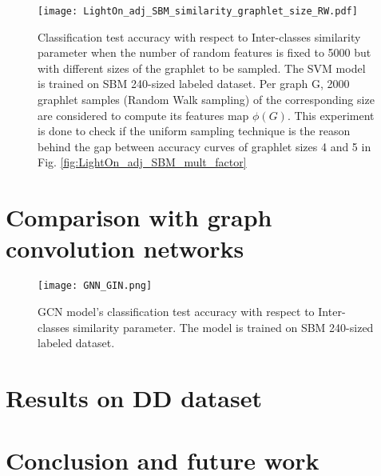 \begin{figure}[H]
\centering
\texttt{[image: LightOn\_adj\_SBM\_similarity\_graphlet\_size\_RW.pdf]}
\caption[Classification test accuracy as a function of Inter-classes similarity parameter ]{Classification test accuracy with respect to Inter-classes similarity parameter when the number of random features is fixed to 5000 but with different sizes of the graphlet to be sampled. The SVM model is trained on SBM 240-sized labeled dataset. Per graph G, 2000 graphlet samples (Random Walk sampling) of the corresponding size are considered to compute its features map $\phi(G)$. This experiment is done to check if the uniform sampling technique is the reason behind the gap between accuracy curves of graphlet sizes 4 and 5 in Fig. \ref{fig:LightOn_adj_SBM_mult_factor} }
\label{fig:LightOn_adj_SBM_multfactor_RW}
\end{figure}

\section{Comparison with graph convolution networks}
\begin{figure}[H]
\centering
\texttt{[image: GNN\_GIN.png]}
\caption[GCN model's classification test accuracy as a function of Inter-classes similarity parameter ]{GCN model's classification test accuracy with respect to Inter-classes similarity parameter. The  model is trained on SBM 240-sized labeled dataset.}
\label{fig:GCN_GIN_SBM_multfactor_RW}
\end{figure}

\section{Results on DD dataset}

\section{Conclusion and future work}




